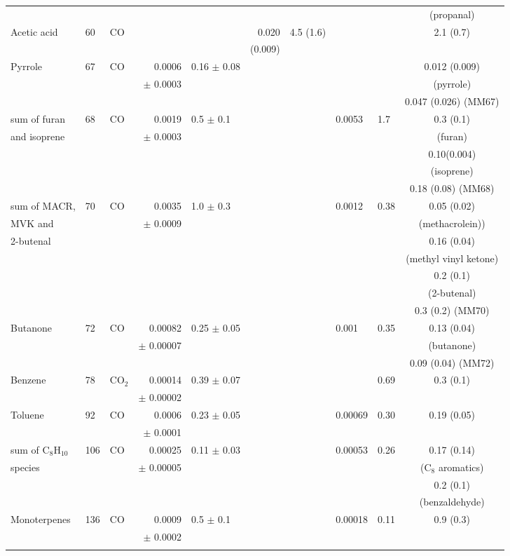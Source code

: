 \documentclass[acp, manuscript]{copernicus}
\begin{document}
\begin{supertabular}{l l l r l r l l l c}
  & &  & & & & & & & (propanal)\\ [20mm]
  Acetic acid & 60  &CO & & & 0.020 & 4.5 (1.6) & & & 2.1 (0.7) \\
  &&&&&(0.009)&&&&\\ 
  Pyrrole & 67 & CO & 0.0006 & 0.16 $\pm$ 0.08 & & & && 0.012 (0.009) \\
  &&&$\pm$ 0.0003&&&&&&(pyrrole) \\
  & & & & & & & & & 0.047 (0.026) (MM67)\\
  sum of furan  & 68  & CO & 0.0019 & 0.5 $\pm$ 0.1 & & & 0.0053 & 1.7 & 0.3 (0.1)  \\ 
  and isoprene &&&$\pm$ 0.0003&&&&&& (furan)\\ 
  & &  & & &&&&&0.10(0.004) \\
  & &  & & &&&&&(isoprene)\\
  &&&&&&&&& 0.18 (0.08) (MM68) \\
  sum of MACR,   & 70 &CO & 0.0035 & 1.0 $\pm$ 0.3 & & & 0.0012 & 0.38 & 0.05 (0.02)  \\ 
  MVK and  & &  & $\pm$ 0.0009 & && & & & (methacrolein)) \\
  2-butenal&&&&&&&&&0.16 (0.04) \\
  &&&&&&&&& (methyl vinyl ketone) \\
  &&&&&&&&& 0.2 (0.1) \\
  &&&&&&&&& (2-butenal)\\
  &&&&&&&&& 0.3 (0.2) (MM70) \\
  Butanone & 72 & CO & 0.00082 & 0.25 $\pm$ 0.05& & & 0.001 & 0.35 & 0.13 (0.04)  \\ 
  &&&$\pm$ 0.00007&&&&&& (butanone) \\
  &&&&&&&&&0.09 (0.04) (MM72) \\
  Benzene & 78 &CO$_2$ & 0.00014 & 0.39 $\pm$ 0.07 & & & & 0.69 & 0.3 (0.1) \\
  &&&$\pm$ 0.00002&&&&&&\\
  Toluene & 92 & CO & 0.0006 & 0.23 $\pm$ 0.05 & & &0.00069 &0.30 & 0.19 (0.05) \\ 
  &&&$\pm$ 0.0001&&&&&&\\
  sum of C$_8$H$_{10}$  & 106 & CO & 0.00025 & 0.11 $\pm$ 0.03 & & & 0.00053 & 0.26 & 0.17 (0.14)  \\
  species &&&$\pm$ 0.00005&&&&&  & (C$_8$ aromatics) \\
  &&&&&&&& &0.2 (0.1) \\
  &&&&&&&&&(benzaldehyde)\\
  Monoterpenes & 136 &CO & 0.0009 & 0.5 $\pm$ 0.1& & &0.00018 & 0.11 & 0.9 (0.3) \\
  &&&$\pm$ 0.0002&&&&&& \\
  \bottomhline
  \label{table:comp} 
  \belowtable{} &&&&&&&&&\\
\end{supertabular}
\end{document}
